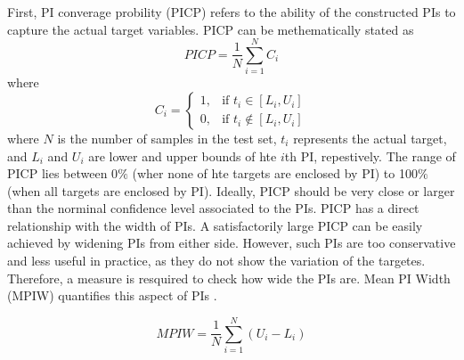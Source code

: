 \documentclass[review]{elsarticle}
\begin{document}
        First,  PI converage probility (PICP) refers to the ability of the constructed PIs to capture the actual target variables.
        PICP can be methematically stated as
        \begin{equation}
          PICP = \frac{1}{N} \sum_{i=1}^{N} C_{i}
          \label{eq.PICP}
        \end{equation}
        where
        \begin{equation}
          C_{i} =
          \begin{cases}
            1, & \text{if  $t_{i} \in [L_{i},U_{i}]$} \\
            0, & \text{if  $t_{i} \not\in [L_{i},U_{i}]$}
          \end{cases}
          \label{eq.Ci}
        \end{equation}
        where $N$ is the number of samples in the test set, $t_{i}$ represents the actual target, and $L_{i}$ and $U_{i}$ are lower and upper bounds of hte $i$th PI, repestively.
        The range of PICP lies between 0$\%$ (wher none of hte targets are enclosed by PI) to 100$\%$ (when all targets are enclosed by PI).
        Ideally, PICP should be very close or larger than the norminal confidence level associated to the PIs.
        PICP has a direct relationship with the width of PIs.
        A satisfactorily large PICP can be easily achieved by widening PIs from either side.
        However, such PIs are too conservative and less useful in practice, as they do not show the variation of the targetes.
        Therefore, a measure is resquired to check how wide the PIs are.
        Mean PI Width (MPIW) quantifies this aspect of PIs \cite{Khosravi2010}.

        \begin{equation}
          MPIW = \frac{1}{N} \sum_{i=1}^{N} (U_{i}-L_{i})
          \label{eq.MPIW}
        \end{equation}
\end{document}
